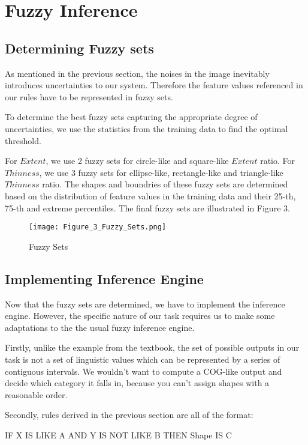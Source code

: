 \section{Fuzzy Inference}

\subsection{Determining Fuzzy sets}

As mentioned in the previous section, the noises in the image inevitably introduces uncertainties to our system. Therefore the feature values referenced in our rules have to be represented in fuzzy sets.

To determine the best fuzzy sets capturing the appropriate degree of uncertainties, we use the statistics from the training data to find the optimal threshold.

For $Extent$, we use 2 fuzzy sets for circle-like and square-like $Extent$ ratio. For $Thinness$, we use 3 fuzzy sets for ellipse-like, rectangle-like and triangle-like $Thinness$ ratio. The shapes and boundries of these fuzzy sets are determined based on the distribution of feature values in the training data and their 25-th, 75-th and extreme percentiles. The final fuzzy sets are illustrated in Figure 3.

\begin{figure}[ht!]
\texttt{[image: Figure\_3\_Fuzzy\_Sets.png]}
\caption{Fuzzy Sets}
\end{figure}

\subsection{Implementing Inference Engine}

Now that the fuzzy sets are determined, we have to implement the inference engine. However, the specific nature of our task requires us to make some adaptations to the the usual fuzzy inference engine.

Firstly, unlike the example from the textbook, the set of possible outputs in our task is not a set of linguistic values which can be represented by a series of contiguous intervals. We wouldn't want to compute a COG-like output and decide which category it falls in, because you can't assign shapes with a reasonable order.

Secondly, rules derived in the previous section are all of the format:

IF X IS LIKE A AND Y IS NOT LIKE B THEN Shape IS C

